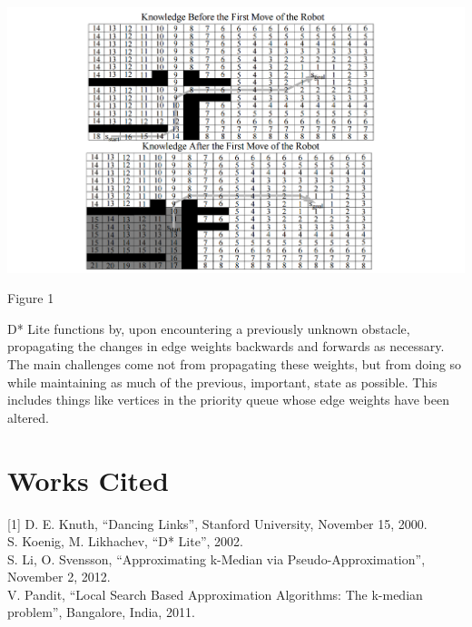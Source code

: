 \documentclass[11pt]{article}
\begin{document}
\begin{center}
    \includegraphics[scale=0.15]{dstarlite}
    
    Figure 1
\end{center}

D* Lite functions by, upon encountering a previously unknown obstacle, propagating the changes in edge weights backwards and forwards as necessary. The main challenges come not from propagating these weights, but from doing so while maintaining as much of the previous, important, state as possible. This includes things like vertices in the priority queue whose edge weights have been altered. 

\section*{Works Cited}

[1] D. E. Knuth, ``Dancing Links'', Stanford University, November 15, 2000.\\\relax
[2] S. Koenig, M. Likhachev, ``D* Lite'', 2002.\\\relax
[3] S. Li, O. Svensson, ``Approximating k-Median via Pseudo-Approximation'', November 2, 2012.\\\relax
[4] V. Pandit, ``Local Search Based Approximation Algorithms: The k-median problem'', Bangalore, India, 2011.\\\relax
\end{document}

